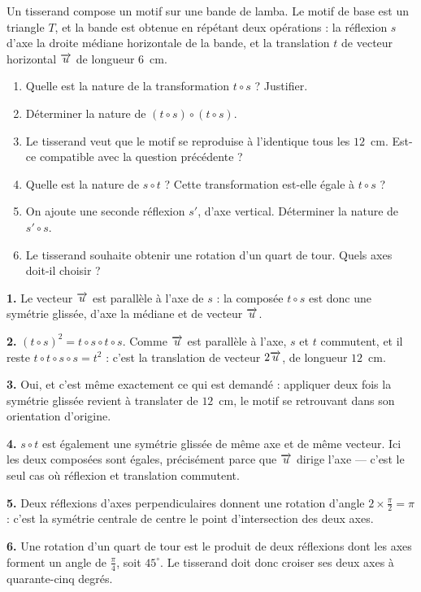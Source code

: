 \begin{jecherche}
Un tisserand compose un motif sur une bande de lamba. Le motif de base est un
triangle $T$, et la bande est obtenue en répétant deux opérations : la
réflexion $s$ d'axe la droite médiane horizontale de la bande, et la
translation $t$ de vecteur horizontal $\overrightarrow{u}$ de longueur $6$~cm.

\begin{enumerate}[label=\textbf{\arabic*.}, leftmargin=*, itemsep=0.3em]
  \item Quelle est la nature de la transformation $t \circ s$ ? Justifier.
  \item Déterminer la nature de $(t \circ s) \circ (t \circ s)$.
  \item Le tisserand veut que le motif se reproduise à l'identique tous les
        $12$~cm. Est-ce compatible avec la question précédente ?
  \item Quelle est la nature de $s \circ t$ ? Cette transformation est-elle
        égale à $t \circ s$ ?
  \item On ajoute une seconde réflexion $s'$, d'axe vertical. Déterminer la
        nature de $s' \circ s$.
  \item Le tisserand souhaite obtenir une rotation d'un quart de tour. Quels
        axes doit-il choisir ?
\end{enumerate}
\end{jecherche}

\begin{corrige}
\textbf{1.} Le vecteur $\overrightarrow{u}$ est parallèle à l'axe de $s$ : la composée
$t \circ s$ est donc une symétrie glissée, d'axe la médiane et de vecteur
$\overrightarrow{u}$.

\textbf{2.} $(t \circ s)^{2} = t \circ s \circ t \circ s$. Comme $\overrightarrow{u}$ est
parallèle à l'axe, $s$ et $t$ commutent, et il reste
$t \circ t \circ s \circ s = t^{2}$ : c'est la translation de vecteur
$2\overrightarrow{u}$, de longueur $12$~cm.

\textbf{3.} Oui, et c'est même exactement ce qui est demandé : appliquer deux
fois la symétrie glissée revient à translater de $12$~cm, le motif se
retrouvant dans son orientation d'origine.

\textbf{4.} $s \circ t$ est également une symétrie glissée de même axe et de
même vecteur. Ici les deux composées sont égales, précisément parce que
$\overrightarrow{u}$ dirige l'axe — c'est le seul cas où réflexion et translation
commutent.

\textbf{5.} Deux réflexions d'axes perpendiculaires donnent une rotation
d'angle $2 \times \frac{\pi}{2} = \pi$ : c'est la symétrie centrale de centre
le point d'intersection des deux axes.

\textbf{6.} Une rotation d'un quart de tour est le produit de deux réflexions
dont les axes forment un angle de $\frac{\pi}{4}$, soit $45^{\circ}$. Le
tisserand doit donc croiser ses deux axes à quarante-cinq degrés.
\end{corrige}


